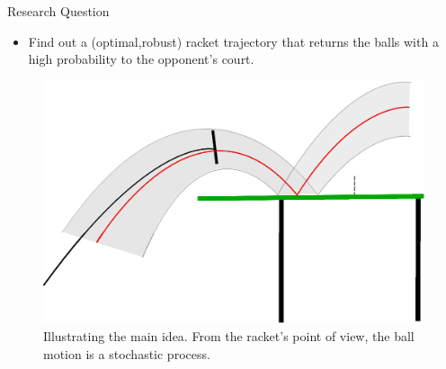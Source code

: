 \documentclass[handout]{beamer}
\begin{document}
%
\begin{frame}{Research Question}
\begin{itemize}
\item Find out a (optimal,robust) racket trajectory that returns the balls with a high probability to the opponent's court.
\end{itemize}
\begin{figure}[t!]
\centering
\includegraphics[scale=0.4]{drawing.eps}			
\caption{Illustrating the main idea. From the racket's point of view, the ball motion is a stochastic process.}
\label{mainIdea}
\end{figure}
\end{frame}
%
\end{document}
